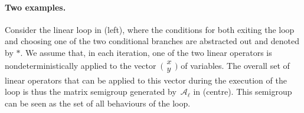 \documentclass{lmcs}
\theoremstyle{definition}
\newcommand{\Aa}{\mathcal{A}}
\begin{document}
\paragraph*{Two examples.}

Consider the linear loop in  (left), where the conditions for both exiting the loop and choosing one of the two conditional branches are abstracted out and denoted by $*$. We assume that, in each iteration, one of the two linear operators is nondeterministically applied to the vector~$\big(\begin{smallmatrix} x \\ y
\end{smallmatrix}\big)$ of variables.
The overall set of linear operators that can be applied to this vector during the execution of the loop is thus the matrix semigroup generated by~$\Aa_\ell$ in  (centre). This semigroup can be seen as the set of all behaviours of the loop.%
\end{document}
